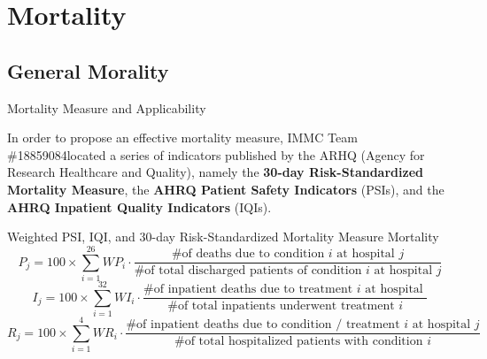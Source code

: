 \documentclass[8pt, hyperref={colorlinks=true}]{beamer}
\newcommand{\team}{IMMC Team \#18859084\hphantom{a}}
\begin{document}
\section{Mortality}

\subsection{General Morality}

\begin{frame}{Mortality Measure and Applicability}
\hypertarget{frm:mortality_measure_and_applicability}{}

In order to propose an effective mortality measure, \team located a series of indicators published by the ARHQ (Agency for Research Healthcare and Quality), namely the \textbf{30-day Risk-Standardized Mortality Measure}, the \textbf{AHRQ Patient Safety Indicators} (PSIs), and the \textbf{AHRQ Inpatient Quality Indicators} (IQIs).

\begin{block}{Weighted PSI, IQI, and 30-day Risk-Standardized Mortality Measure Mortality}
\[
P_j = 100 \times \sum_{i=1}^{26} WP_i \cdot  \frac{\text{\# of deaths due to condition $i$ at hospital $j$}}{\text{\# of total discharged patients of condition $i$ at hospital $j$}}
\]
\[
I_j = 100 \times \sum_{i=1}^{32} WI_i \cdot \frac{\text{\# of inpatient deaths due to treatment $i$ at hospital } }{\text{\# of total inpatients underwent treatment }i}
\]
\[
R_j = 100 \times \sum_{i=1}^{4} WR_i \cdot \frac{\text{\# of inpatient deaths due to condition / treatment $i$ at hospital } j}{\text{\# of total hospitalized patients with condition }i}
\]
\end{block}



\end{frame}
\end{document}
